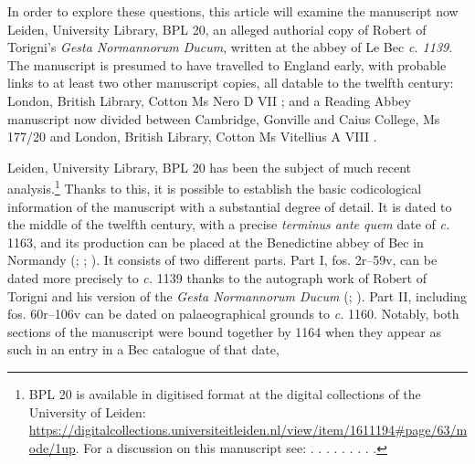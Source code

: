 \documentclass{article}
\begin{document}
In order to explore these questions, this article will examine the
manuscript now Leiden, University Library, BPL 20, an alleged authorial
copy of Robert of Torigni's \emph{Gesta Normannorum Ducum}, written at
the abbey of Le Bec \emph{c. 1139}. The manuscript is presumed to have
travelled to England early, with probable links to at least two other
manuscript copies, all datable to the twelfth century: London, British
Library, Cotton Ms Nero D VII \citep[xcvi]{van_houts_gesta_1992}; and a Reading
Abbey manuscript now divided between Cambridge, Gonville and Caius
College, Ms 177/20 and London, British Library, Cotton Ms Vitellius A
VIII \citep[cxii]{van_houts_gesta_1992}.

Leiden, University Library, BPL 20 has been the subject of much recent
analysis.\footnote{BPL 20 is available in digitised format at the
  digital collections of the University of Leiden:
  \url{https://digitalcollections.universiteitleiden.nl/view/item/1611194\#page/63/mode/1up}.
  For a discussion on this manuscript see: \cite[cix]{van_houts_gesta_1992}. \cite[23--25]{crick_historia_1991}. \cite[58--64]{pohl_abbas_2014}. \cite[101--102]{pohl_robert_2018}. \cite[94--95]{cleaver_autograph_2018}. \cite[150]{weston_manuscripts_2017}. \cite[289--298]{avril_notes_1964}. \cite[2--6]{dumville_early_1985}.
  \cite[80--81]{hermans_history_1983}.} Thanks to this, it is possible to
establish the basic codicological information of the manuscript with a
substantial degree of detail. It is dated to the middle of the twelfth
century, with a precise \emph{terminus ante quem} date of \emph{c.} 1163,
and its production can be placed at the Benedictine abbey of Bec in
Normandy (\cite[211]{avril_notes_1964}; \cite[80--81]{hermans_history_1983}; \cite[4]{dumville_early_1985}). It consists of two different parts. Part I, fos. 2r--59v, can
be dated more precisely to \emph{c.} 1139 thanks to the autograph work
of Robert of Torigni and his version of the \emph{Gesta Normannorum
Ducum} (\cite[cix]{van_houts_gesta_1992}; \cite[23--25]{crick_historia_1991}). Part II, including fos.
60r--106v can be dated on palaeographical grounds to \emph{c.} 1160.
Notably, both sections of the manuscript were bound together by 1164
when they appear as such in an entry in a Bec catalogue of that date,
\end{document}
